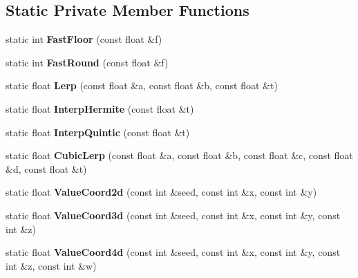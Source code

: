 \subsection*{Static Private Member Functions}
\begin{DoxyCompactItemize}
\item 
\mbox{\label{class_flounder_1_1_noise_fast_afd47d9d1e8fd39a2d5853d8328ed1ca7}} 
static int {\bfseries Fast\+Floor} (const float \&f)
\item 
\mbox{\label{class_flounder_1_1_noise_fast_a6a8bfeeca90ae6fd4a0da34e19a8b7e4}} 
static int {\bfseries Fast\+Round} (const float \&f)
\item 
\mbox{\label{class_flounder_1_1_noise_fast_a85094dd81df420720e2179165ea7730d}} 
static float {\bfseries Lerp} (const float \&a, const float \&b, const float \&t)
\item 
\mbox{\label{class_flounder_1_1_noise_fast_ae8b596edd731b0e5920717c1ae83b856}} 
static float {\bfseries Interp\+Hermite} (const float \&t)
\item 
\mbox{\label{class_flounder_1_1_noise_fast_abbb41d3f6d55687c98c5a94e141ff7ba}} 
static float {\bfseries Interp\+Quintic} (const float \&t)
\item 
\mbox{\label{class_flounder_1_1_noise_fast_af497163b4a1bfb1c961af9c0a9c05b3f}} 
static float {\bfseries Cubic\+Lerp} (const float \&a, const float \&b, const float \&c, const float \&d, const float \&t)
\item 
\mbox{\label{class_flounder_1_1_noise_fast_a5c5e742d0e9103bfbfc5728a70382551}} 
static float {\bfseries Value\+Coord2d} (const int \&seed, const int \&x, const int \&y)
\item 
\mbox{\label{class_flounder_1_1_noise_fast_a79b5c8df11dcefb893e5a817b01275fc}} 
static float {\bfseries Value\+Coord3d} (const int \&seed, const int \&x, const int \&y, const int \&z)
\item 
\mbox{\label{class_flounder_1_1_noise_fast_a78e4d399b050eec7febb396169ea00ad}} 
static float {\bfseries Value\+Coord4d} (const int \&seed, const int \&x, const int \&y, const int \&z, const int \&w)
\end{DoxyCompactItemize}
